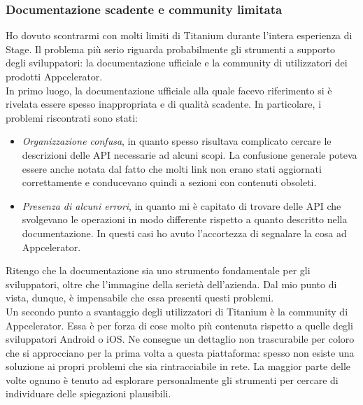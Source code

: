 			\subsubsection{Documentazione scadente e community limitata}
				Ho dovuto scontrarmi con molti limiti di Titanium durante l'intera esperienza di Stage. Il problema più serio
				riguarda probabilmente gli strumenti a supporto degli sviluppatori: la documentazione ufficiale e la community di
				utilizzatori dei prodotti Appcelerator.\\
				In primo luogo, la documentazione ufficiale alla quale facevo riferimento si è rivelata essere spesso inappropriata e
				di qualità scadente. In particolare, i problemi riscontrati sono stati:
				\begin{itemize}
					\item \emph{Organizzazione confusa}, in quanto spesso risultava complicato cercare le descrizioni delle API
					necessarie ad alcuni scopi. La confusione generale poteva essere anche notata dal fatto che molti link non
					erano stati aggiornati correttamente e conducevano quindi a sezioni con contenuti obsoleti.
					\item \emph{Presenza di alcuni errori}, in quanto mi è capitato di trovare delle API che svolgevano le
					operazioni in modo differente rispetto a quanto descritto nella documentazione. In questi casi ho avuto
					l'accortezza di segnalare la cosa ad Appcelerator.
				\end{itemize}
				Ritengo che la documentazione sia uno strumento fondamentale per gli sviluppatori, oltre che l'immagine della serietà
				dell'azienda. Dal mio punto di vista, dunque, è impensabile che essa presenti questi problemi.\\
				Un secondo punto a svantaggio degli utilizzatori di Titanium è la community di Appcelerator. Essa è per forza di cose
				molto più contenuta rispetto a quelle degli sviluppatori Android o iOS. Ne consegue un dettaglio non trascurabile per
				coloro che si approcciano per la prima volta a questa piattaforma: spesso non esiste una soluzione ai propri problemi
				che sia rintracciabile in rete. La maggior parte delle volte ognuno è tenuto ad esplorare personalmente gli strumenti
				per cercare di individuare delle spiegazioni plausibili.
